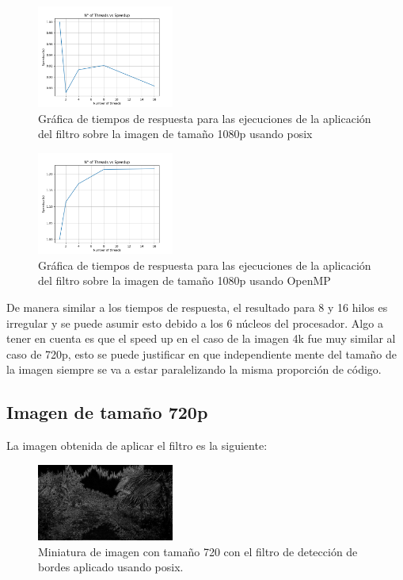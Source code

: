 \begin{figure}[H]
    \centering
    \includegraphics[width=0.4\textwidth]{../plots/1080p_speedup.png}
    \caption{Gráfica de tiempos de respuesta para las ejecuciones de la aplicación del filtro sobre la imagen de tamaño 1080p usando posix}
\end{figure}

\begin{figure}[H]
    \centering
    \includegraphics[width=0.4\textwidth]{../plots/omp_1080p_speedup.png}
    \caption{Gráfica de tiempos de respuesta para las ejecuciones de la aplicación del filtro sobre la imagen de tamaño 1080p usando OpenMP}
\end{figure}

De manera similar a los tiempos de respuesta, el resultado para 8 y 16 hilos es irregular y se puede asumir esto debido a los 6 núcleos del procesador. Algo a tener en cuenta es que el speed up en el caso de la imagen 4k fue muy similar al caso de 720p, esto se puede justificar en que independiente mente del tamaño de la imagen siempre se va a estar paralelizando la misma proporción de código.

\subsection{Imagen de tamaño 720p}

La imagen obtenida de aplicar el filtro es la siguiente:

\begin{figure}[H]
    \centering
    \includegraphics[width=0.4\textwidth]{../plots/720p.out.jpg}
    \caption{Miniatura de imagen con tamaño 720 con el filtro de detección de bordes aplicado usando posix.}
\end{figure}

